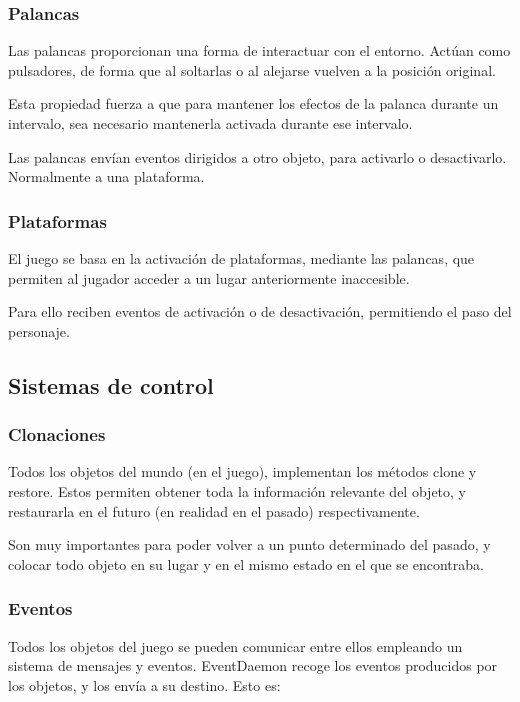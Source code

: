 \documentclass[11pt,a4paper]{article}
\begin{document}
\subsubsection{Palancas}
Las palancas proporcionan una forma de interactuar con el entorno. Actúan como 
pulsadores, de forma que al soltarlas o al alejarse vuelven a la posición 
original.

Esta propiedad fuerza a que para mantener los efectos de la palanca durante un 
intervalo, sea necesario mantenerla activada durante ese intervalo.

Las palancas envían eventos dirigidos a otro objeto, para activarlo o
desactivarlo. Normalmente a una plataforma.

\subsubsection{Plataformas}
El juego se basa en la activación de plataformas, mediante las palancas, que 
permiten al jugador acceder a un lugar anteriormente inaccesible.

Para ello reciben eventos de activación o de desactivación, permitiendo el paso 
del personaje.

\subsection{Sistemas de control}

\subsubsection{Clonaciones}

Todos los objetos del mundo (en el juego), implementan los métodos clone y 
restore. Estos permiten obtener toda la información relevante del objeto, y 
restaurarla en el futuro (en realidad en el pasado) respectivamente.

Son muy importantes para poder volver a un punto determinado del pasado, y 
colocar todo objeto en su lugar y en el mismo estado en el que se encontraba.

\subsubsection{Eventos}

Todos los objetos del juego se pueden comunicar entre ellos empleando un sistema 
de mensajes y eventos. EventDaemon recoge los eventos producidos por los 
objetos, y los envía a su destino. Esto es:
\end{document}
